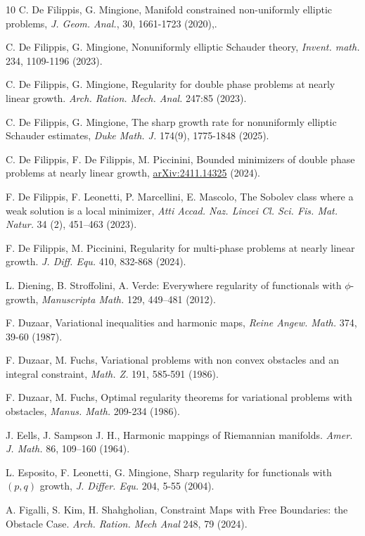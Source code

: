 \documentclass[a4paper]{amsart}
\theoremstyle{plain}  %
\numberwithin{equation}{section}
\begin{document}
\begin{thebibliography}{10}
 {C. De Filippis, G. Mingione}, Manifold constrained non-uniformly elliptic problems, \emph{J. Geom. Anal.}, 30, 1661-1723 (2020),.	

 C. De Filippis, G. Mingione, Nonuniformly elliptic Schauder theory, \emph{Invent. math.} 234, 1109-1196 (2023). 

 C. De Filippis, G. Mingione, Regularity for double phase problems at nearly linear growth. \emph{Arch. Ration. Mech.
Anal.} 247:85 (2023).

 C. De Filippis, G. Mingione, The sharp growth rate for nonuniformly elliptic Schauder estimates, \emph{ Duke Math. J.} 174(9), 1775-1848 (2025).

 C. De Filippis, F. De Filippis, M. Piccinini, Bounded minimizers of double phase problems at nearly linear growth, \href{https://doi.org/10.48550/arXiv.2411.14325}{arXiv:2411.14325} (2024).

F. De Filippis, F. Leonetti, P. Marcellini, E. Mascolo, The Sobolev class where a weak solution is a local minimizer, \emph{Atti Accad. Naz. Lincei Cl. Sci. Fis. Mat. Natur.} 34 (2), 451–463 (2023).

 F. De Filippis, M. Piccinini, Regularity for multi-phase problems at nearly linear growth. \emph{J. Diff. Equ.} 410,
832-868 (2024).


 L. Diening, B. Stroffolini, A. Verde: Everywhere regularity of functionals with $\phi$-growth, \emph{
Manuscripta Math.} 129, 449–481 (2012).

 F. Duzaar, Variational inequalities and harmonic maps, \emph{ Reine Angew. Math.} 374, 39-60 (1987).

 F. Duzaar, M. Fuchs, Variational problems with non convex obstacles and an integral constraint, \emph{Math. Z.} 191,  585-591 (1986).

 F. Duzaar, M. Fuchs, Optimal regularity theorems for variational problems with obstacles, \emph{Manus. Math.} 209-234 (1986).

J. Eells, J. Sampson J. H., Harmonic mappings of Riemannian manifolds. \emph{Amer. J. Math.} 86, 109–160 (1964).


  L. Esposito, F. Leonetti, G. Mingione,  Sharp regularity for functionals with $(p, q)$ growth, \emph{J. Differ. Equ. }204, 5-55 (2004).

 A. Figalli, S. Kim,
H. Shahgholian, Constraint Maps with Free Boundaries: the Obstacle Case. \emph{Arch. Ration. Mech Anal} 248, 79 (2024).


\end{thebibliography}
\end{document}

